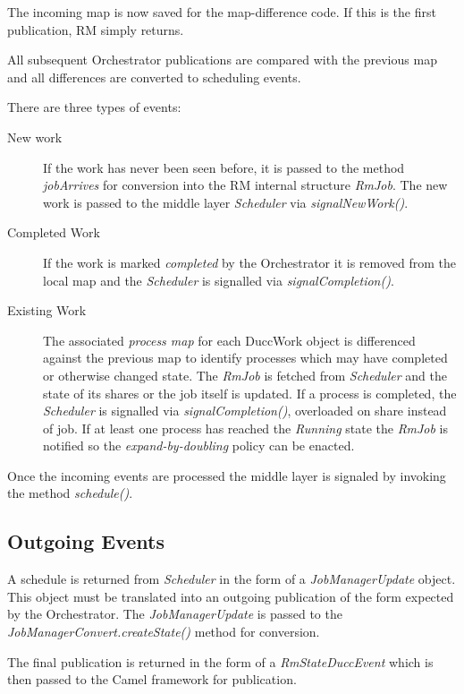      The incoming map is now saved for the map-difference code.  If this is the first publication,
     RM simply returns.

     All subsequent Orchestrator publications are compared with the previous map and
     all differences are converted to scheduling events. 

     There are three types of events:
     \begin{description}
       \item[New work] If the work has never been seen before, it is passed to the method
         {\em jobArrives} for conversion into the RM internal structure {\em RmJob}.  The new
         work is passed to the middle layer {\em Scheduler} via {\em signalNewWork()}.
       \item[Completed Work] If the work is marked {\em completed} by the Orchestrator it is
         removed from the local map and the {\em Scheduler} is signalled via {\em signalCompletion()}.
       \item[Existing Work] The associated {\em process map} for each DuccWork object is differenced against the
         previous map to identify processes which may have
         completed or otherwise changed state.  The {\em RmJob} is fetched from {\em Scheduler} and
         the state of its shares or the job itself is updated.  If a process is completed,
         the {\em Scheduler} is signalled via {\em signalCompletion()}, overloaded on share instead of job.  If
         at least one process has reached the {\em Running} state the {\em RmJob} is notified so
         the {\em expand-by-doubling} policy can be enacted.
     \end{description}

     Once the incoming events are processed the middle layer is signaled by invoking the method
     {\em schedule()}.

\subsection{Outgoing Events}
     A schedule is returned from {\em Scheduler} in the form of a {\em JobManagerUpdate} object.  This
     object must be translated into an outgoing publication of the form expected by the Orchestrator.  The
     {\em JobManagerUpdate} is passed to the {\em JobManagerConvert.createState()} method for conversion.

     The final publication is returned in the form of a {\em RmStateDuccEvent} which is then passed to the
     Camel framework for publication.

